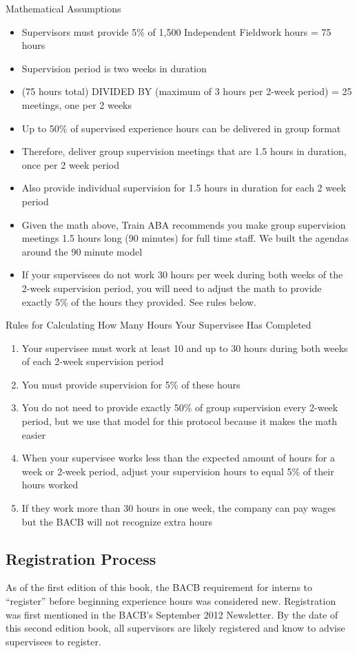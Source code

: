 Mathematical Assumptions\\
\begin{itemize}
\item Supervisors must provide 5\% of 1,500 Independent Fieldwork hours = 75 hours
\item Supervision period is two weeks in duration
\item (75 hours total) DIVIDED BY (maximum of 3 hours per 2-week period) = 25 meetings, one per 2 weeks
\item Up to 50\% of supervised experience hours can be delivered in group format
\item Therefore, deliver group supervision meetings that are 1.5 hours in duration, once per 2 week period
\item Also provide individual supervision for 1.5 hours in duration for each 2 week period
\item Given the math above, Train ABA recommends you make group supervision meetings 1.5 hours long (90 minutes) for full time staff. We built the agendas around the 90 minute model
\item If your supervisees do not work 30 hours per week during both weeks of the 2-week supervision period, you will need to adjust the math to provide exactly 5\% of the hours they provided. See rules below.
\end{itemize}
    
Rules for Calculating How Many Hours Your Supervisee Has Completed\\
\begin{enumerate}
\item Your supervisee must work at least 10 and up to 30 hours during both weeks of each 2-week supervision period
\item You must provide supervision for 5\% of these hours
\item You do not need to provide exactly 50\% of group supervision every 2-week period, but we use that model for this protocol because it makes the math easier
\item When your supervisee works less than the expected amount of hours for a week or 2-week period, adjust your supervision hours to equal 5\% of their hours worked
\item If they work more than 30 hours in one week, the company can pay wages but the BACB\textregistered{} will not recognize extra hours
\end{enumerate}

\subsection{Registration Process}
As of the first edition of this book, the BACB\textregistered{} requirement for interns to ``register'' before beginning experience hours was considered new. Registration was first mentioned in the BACB\textregistered{}'s September 2012 Newsletter. By the date of this second edition book, all supervisors are likely registered and know to advise supervisees to register.\\

